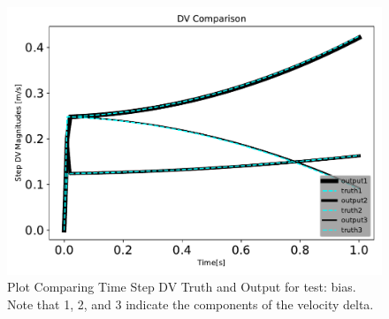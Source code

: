 \begin{figure}[htbp]\centerline{\includegraphics[height=0.7\textwidth, keepaspectratio]{AutoTeX/biasDVcomparison}}\caption{Plot Comparing Time Step DV Truth and Output for test: bias. Note that 1, 2, and 3 indicate the components of the velocity delta.}\label{fig:biasDVcomparison}\end{figure}